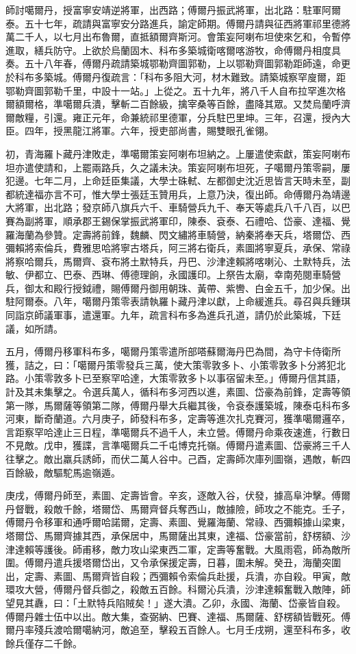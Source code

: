 \begin{pinyinscope}
師討噶爾丹，授富寧安靖逆將軍，出西路；傅爾丹振武將軍，出北路：駐軍阿爾泰。五十七年，疏請與富寧安分路進兵，諭定師期。傅爾丹請與征西將軍祁里德將萬二千人，以七月出布魯爾，直抵額爾齊斯河。會策妄阿喇布坦使來乞和，令暫停進取，繕兵防守。上欲於烏蘭固木、科布多築城衛喀爾喀游牧，命傅爾丹相度具奏。五十八年春，傅爾丹疏請築城鄂勒齊圖郭勒，上以鄂勒齊圖郭勒距師遠，命更於科布多築城。傅爾丹復疏言：「科布多阻大河，材木難致。請築城察罕廋爾，距鄂勒齊圖郭勒千里，中設十一站。」上從之。五十九年，將八千人自布拉罕進次格爾額爾格，準噶爾兵潰，擊斬二百餘級，擒宰桑等百餘，盡降其眾。又焚烏蘭呼濟爾敵糧，引還。雍正元年，命兼統祁里德軍，分兵駐巴里坤。三年，召還，授內大臣。四年，授黑龍江將軍。六年，授吏部尚書，賜雙眼孔雀翎。

初，青海羅卜藏丹津敗走，準噶爾策妄阿喇布坦納之。上屢遣使索獻，策妄阿喇布坦亦遣使請和，上罷兩路兵，久之議未決。策妄阿喇布坦死，子噶爾丹策零嗣，屢犯邊。七年二月，上命廷臣集議，大學士硃軾、左都御史沈近思皆言天時未至，副都統達福亦言不可，惟大學士張廷玉贊用兵，上意乃決，復出師。命傅爾丹為靖邊大將軍，出北路；發京師八旗兵六千、車騎營兵九千、奉天等處兵八千八百，以巴賽為副將軍，順承郡王錫保掌振武將軍印，陳泰、袞泰、石禮哈、岱豪、達福、覺羅海蘭為參贊。定壽將前鋒，魏麟、閃文繡將車騎營，納秦將奉天兵，塔爾岱、西彌賴將索倫兵，費雅思哈將寧古塔兵，阿三將右衛兵，素圖將寧夏兵，承保、常祿將察哈爾兵，馬爾齊、袞布將土默特兵，丹巴、沙津達賴將喀喇沁、土默特兵，法敏、伊都立、巴泰、西琳、傅德理餉，永國護印。上祭告太廟，幸南苑閱車騎營兵，御太和殿行授鉞禮，賜傅爾丹御用朝珠、黃帶、紫轡、白金五千，加少保。出駐阿爾泰。八年，噶爾丹策零表請執羅卜藏丹津以獻，上命緩進兵。尋召與兵鍾琪同詣京師議軍事，遣還軍。九年，疏言科布多為進兵孔道，請仍於此築城，下廷議，如所請。

五月，傅爾丹移軍科布多，噶爾丹策零遣所部嗒蘇爾海丹巴為間，為守卡侍衛所獲，詰之，曰：「噶爾丹策零發兵三萬，使大策零敦多卜、小策零敦多卜分將犯北路。小策零敦多卜已至察罕哈達，大策零敦多卜以事宿留未至。」傅爾丹信其語，計及其未集擊之。令選兵萬人，循科布多河西以進，素圖、岱豪為前鋒，定壽等領第一隊，馬爾薩等領第二隊，傅爾丹舉大兵繼其後，令袞泰護築城，陳泰屯科布多河東，斷奇蘭道。六月庚子，師發科布多，定壽等進次扎克賽河，獲準噶爾邏卒，言距察罕哈達止三日程，準噶爾兵不過千人，未立營。傅爾丹命乘夜速進，行數日不見敵。戊申，獲諜，言準噶爾兵二千屯博克托嶺。傅爾丹遣素圖、岱豪將三千人往擊之。敵出羸兵誘師，而伏二萬人谷中。己酉，定壽師次庫列圖嶺，遇敵，斬四百餘級，敵驅駝馬逾嶺遁。

庚戌，傅爾丹師至，素圖、定壽皆會。辛亥，逐敵入谷，伏發，據高阜沖擊。傅爾丹督戰，殺敵千餘，塔爾岱、馬爾齊督兵奪西山，敵據險，師攻之不能克。壬子，傅爾丹令移軍和通呼爾哈諾爾，定壽、素圖、覺羅海蘭、常祿、西彌賴據山梁東，塔爾岱、馬爾齊據其西，承保居中，馬爾薩出其東，達福、岱豪當前，舒楞額、沙津達賴等護後。師甫移，敵力攻山梁東西二軍，定壽等奮戰。大風雨雹，師為敵所圍。傅爾丹遣兵援塔爾岱出，又令承保援定壽，日暮，圍未解。癸丑，海蘭突圍出，定壽、素圖、馬爾齊皆自殺；西彌賴令索倫兵赴援，兵潰，亦自殺。甲寅，敵環攻大營，傅爾丹督兵御之，殺敵五百餘。科爾沁兵潰，沙津達賴奮戰入敵陣，師望見其纛，曰：「土默特兵陷賊矣！」遂大潰。乙卯，永國、海蘭、岱豪皆自殺。傅爾丹雜士伍中以出。敵大集，查弼納、巴賽、達福、馬爾薩、舒楞額皆戰死。傅爾丹率殘兵渡哈爾噶納河，敵追至，擊殺五百餘人。七月壬戌朔，還至科布多，收餘兵僅存二千餘。


\end{pinyinscope}
